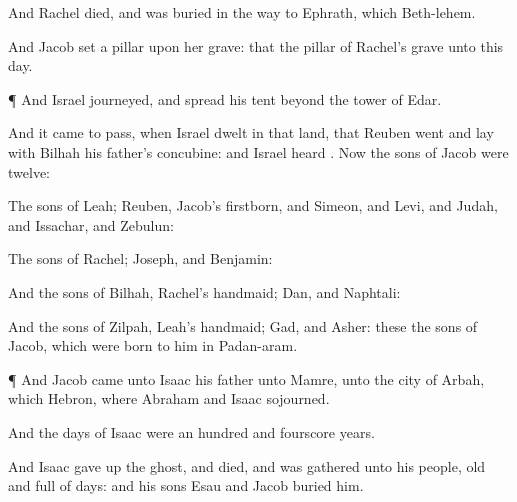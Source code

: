 {And
Rachel
died, and was
buried in the
way to
Ephrath, which
{}
Beth-lehem.

And
Jacob
set a
pillar upon her
grave: that
{} the
pillar of
Rachel’s
grave unto this
day.


\par }{\PP {}¶ And
Israel
journeyed, and
spread his
tent
beyond the
tower of
Edar.

And it came to pass, when
Israel
dwelt in that
land, that
Reuben
went and
lay with
Bilhah his
father’s
concubine: and
Israel
heard
{}. Now the
sons of
Jacob were
twelve:

The
sons of
Leah;
Reuben,
Jacob’s
firstborn, and
Simeon, and
Levi, and
Judah, and
Issachar, and
Zebulun:

The
sons of
Rachel;
Joseph, and
Benjamin:

And the
sons of
Bilhah,
Rachel’s
handmaid;
Dan, and
Naphtali:

And the
sons of
Zilpah,
Leah’s
handmaid;
Gad, and
Asher: these
{} the
sons of
Jacob, which were
born to him in
Padan-aram.


\par }{\PP {}¶ And
Jacob
came unto
Isaac his
father unto
Mamre, unto the city of
Arbah, which
{}
Hebron, where
Abraham and
Isaac
sojourned.

And the
days of
Isaac were an
hundred and
fourscore
years.

And
Isaac gave up the
ghost, and
died, and was
gathered unto his
people,
{}
old and
full of
days: and his
sons
Esau and
Jacob
buried him.




\par }

